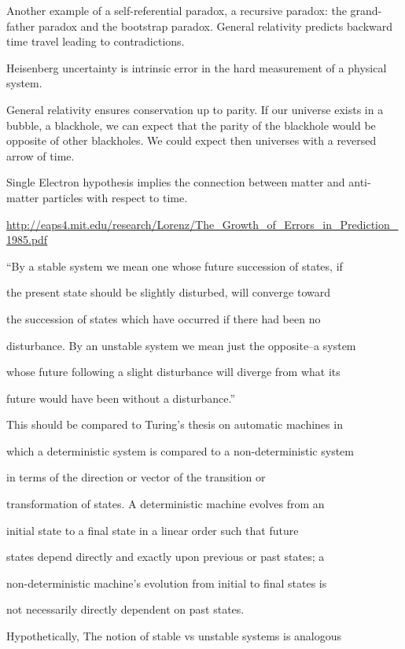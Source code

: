 Another example of a self-referential paradox, a recursive paradox: the
grand-father paradox and the bootstrap paradox. General relativity
predicts backward time travel leading to contradictions.

Heisenberg uncertainty is intrinsic error in the hard measurement of a
physical system.

General relativity ensures conservation up to parity. If our universe
exists in a bubble, a blackhole, we can expect that the parity of the
blackhole would be opposite of other blackholes. We could expect then
universes with a reversed arrow of time.

Single Electron hypothesis implies the connection between matter and
anti-matter particles with respect to time.

\href{http://eaps4.mit.edu/research/Lorenz/The_Growth_of_Errors_in_Prediction_1985.pdf}{\ul{http://eaps4.mit.edu/research/Lorenz/The\_Growth\_of\_Errors\_in\_Prediction\_1985.pdf}}

``By a stable system we mean one whose future succession of states, if

the present state should be slightly disturbed, will converge toward

the succession of states which have occurred if there had been no

disturbance. By an unstable system we mean just the opposite--a system

whose future following a slight disturbance will diverge from what its

future would have been without a disturbance.''

This should be compared to Turing's thesis on automatic machines in

which a deterministic system is compared to a non-deterministic system

in terms of the direction or vector of the transition or

transformation of states. A deterministic machine evolves from an

initial state to a final state in a linear order such that future

states depend directly and exactly upon previous or past states; a

non-deterministic machine's evolution from initial to final states is

not necessarily directly dependent on past states.

Hypothetically, The notion of stable vs unstable systems is analogous

